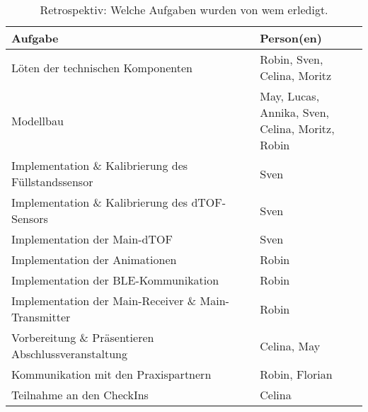     \begin{table}[H]
        \centering
        \begin{tabularx}{\textwidth}{ | l | X | }                
            \hline
                \textbf{Aufgabe} & \textbf{Person(en)} \\
            \hline
                Löten der technischen Komponenten &  \makecell[l]{Robin, Sven,\\Celina, Moritz} \\ 
            \hline
                Modellbau & \makecell[l]{May, Lucas,\\Annika, Sven,\\Celina, Moritz, Robin} \\ 
            \hline
                Implementation \& Kalibrierung des Füllstandssensor & Sven \\
            \hline
                Implementation \& Kalibrierung des dTOF-Sensors & Sven \\
            \hline
                Implementation der Main-dTOF & Sven \\
            \hline
                Implementation der Animationen & Robin \\
            \hline
                Implementation der BLE-Kommunikation & Robin \\
            \hline
                Implementation der Main-Receiver \& Main-Transmitter & Robin \\
            \hline
                Vorbereitung \& Präsentieren Abschlussveranstaltung & Celina, May \\
            \hline
                Kommunikation mit den Praxispartnern & Robin, Florian \\
            \hline
                Teilnahme an den CheckIns & Celina \\
            \hline
        \end{tabularx}
        \caption{Retrospektiv: Welche Aufgaben wurden von wem erledigt.}
        \label{table:detailed_task_}
    \end{table}